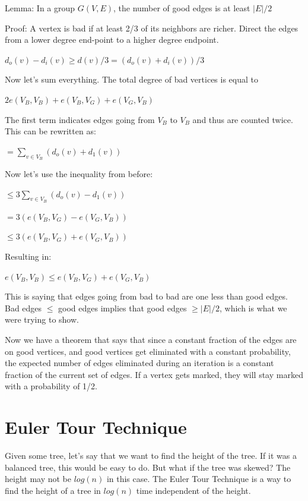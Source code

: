 \documentclass[twoside]{article}
\begin{document}
Lemma:  In a group $G(V,E)$, the number of good edges is at least $|E|/2$ 

Proof:  A vertex is bad if at least 2/3 of its neighbors are richer.  Direct the edges from a lower degree end-point to a higher degree endpoint.

\begin{center}
$d_o(v) - d_i(v) \geq d(v)/3 = (d_o(v) + d_i(v))/3$
\end{center}

Now let's sum everything.  The total degree of bad vertices  is equal to 
\begin{center}
$2e(V_B, V_B) + e(V_B, V_G) + e(V_G, V_B)$
\end{center}

The first term indicates edges going from $V_B$ to $V_B$ and thus are counted twice.  This can be rewritten as:
\begin{center}
$= \sum\limits_{v \in V_B} (d_o(v)  + d_1(v))$
\end{center}

Now let's use the inequality from before:
\begin{center}
$\leq 3\sum\limits_{v \in V_B} (d_o(v)  - d_1(v))$

$= 3(e(V_B, V_G) - e(V_G, V_B))$

$\leq 3(e(V_B, V_G) + e(V_G, V_B))$
\end{center}

Resulting in:

\begin{center}
$e(V_B, V_B) \leq e(V_B, V_G) + e(V_G, V_B)$
\end{center}

This is saying that edges going from bad to bad are one less than good edges.  Bad edges $\leq$ good edges implies that good edges $\geq |E|/2$, which is what we were trying to show.

Now we have a theorem that says that since a constant fraction of the edges are on good vertices, and good vertices get eliminated with a constant probability, the expected number of edges eliminated during an iteration is a constant fraction of the current set of edges.  If a vertex gets marked, they will stay marked with a probability of 1/2.

\clearpage
\section{Euler Tour Technique}
Given some tree, let's say that we want to find the height of the tree.  If it was a balanced tree, this would be easy to do.  But what if the tree was skewed?  The height may not be $log(n)$ in this case.  The Euler Tour Technique is a way to find the height of a tree in $log(n)$ time independent of the height.
\end{document}
